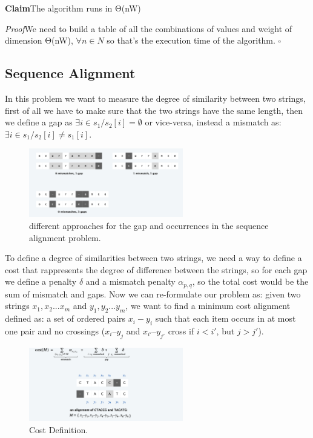 \documentclass[11pt]{article}
\newenvironment{claim}[1]{\par\textbf{Claim}\space#1}{}
\newenvironment{proof}[1]{\par\textit{Proof}\space#1}{\hfill\ensuremath{\square}}
\begin{document}
\begin{claim}
The algorithm runs in Θ(nW)
\end{claim}

\begin{proof}
We need to build a table of all the combinations of values and weight of dimension Θ(nW), $\forall n \in N$ so that's the execution time of the algorithm.
\end{proof}

\subsection{Sequence Alignment}
In this problem we want to measure the degree of similarity between two strings, first of all we have to make sure that the two strings have the same length, then we define a gap as $ \exists i \in s_{1} / s_2[i] = \emptyset$ or vice-versa, instead a mismatch as: $\exists i \in s_{1} / s_2[i] \neq s_{1}[i]$.

\begin{figure}[H]
		\centering
		\includegraphics[width=0.6\textwidth ]{sequence}
		\caption{different approaches for the gap and occurrences in the sequence alignment problem.}
\end{figure}

To define a degree of similarities between two strings, we need a way to define a cost that rappresents the degree of difference between the strings, so for each gap we define a penalty $\delta$ and a mismatch penalty $\alpha_{p,q}$, so the total cost would be the sum of mismatch and gaps. Now we can re-formulate our problem as: given two strings $x_{1},x_{2}...x_{m}$ and $y_{1},y_{2}...y_{m}$, we want to find a minimum cost alignment defined as: a set of ordered pairs $x_{i} - y_{i}$ such that each item occurs in at most one pair and no crossings ($x_{i} – y_{j}$ and $x_{i'} – y_{j'}$ cross if $i < i '$, but $j > j '$).

\begin{figure}[H]
		\centering
		\includegraphics[width=0.6\textwidth ]{sequence2}
		\caption{Cost Definition.}
\end{figure}
\end{document}

